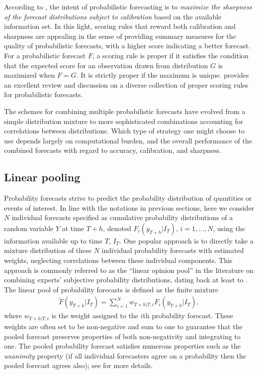 \documentclass[11pt]{article}
\begin{document}
According to \citet{Gneiting2007-fr}, the intent of probabilistic forecasting is to \textit{maximize the sharpness of the forecast distributions subject to calibration} based on the available information set. In this light, scoring rules that reward both calibration and sharpness are appealing in the sense of providing summary measures for the quality of probabilistic forecasts, with a higher score indicating a better forecast. For a probabilistic forecast $F$, a scoring rule is proper if it satisfies the condition that the expected score for an observation drawn from distribution $G$ is maximized when $F=G$. It is strictly proper if the maximum is unique. \citet{Gneiting2007-ij} provides an excellent review and discussion on a diverse collection of proper scoring rules for probabilistic forecasts.

The schemes for combining multiple probabilistic forecasts have evolved from a simple distribution mixture to more sophisticated combinations accounting for correlations between distributions. Which type of strategy one might choose to use depends largely on computational burden, and the overall performance of the combined forecasts with regard to accuracy, calibration, and sharpness. 

\subsection{Linear pooling}
\label{sec:linear_pooling}

Probability forecasts strive to predict the probability distribution of quantities or events of interest. In line with the notations in previous sections, here we consider $N$ individual forecasts specified as cumulative probability distributions of a random variable $Y$ at time $T+h$, denoted $F_{i}(y_{T+h}|I_{T})$, $i=1,\dots,N$, using the information available up to time $T$, $I_{T}$. One popular approach is to directly take a mixture distribution of these $N$ individual probability forecasts with estimated weights, neglecting correlations between these individual components. This approach is commonly referred to as the ``linear opinion pool'' in the literature on combining experts' subjective probability distributions, dating back at least to \citet{Stone1961-zd}. The linear pool of probability forecasts is defined as the finite mixture
\begin{align}
  \label{eq:linear_pool}
  \tilde{F}(y_{T+h}|I_{T}) = \sum_{i=1}^{N} w_{T+h|T,i} F_{i}(y_{T+h}|I_{T}),
\end{align}
where $w_{T+h|T,i}$ is the weight assigned to the $i$th probability forecast. These weights are often set to be non-negative and sum to one to guarantee that the pooled forecast preserves properties of both non-negativity and integrating to one. The pooled probability forecast satisfies numerous properties such as the \textit{unanimity} property (if all individual forecasters agree on a probability then the pooled forecast agrees also); see \citet{Clemen1999-mh} for more details.
\end{document}

